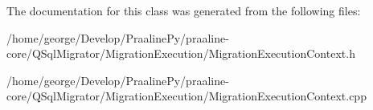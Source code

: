 The documentation for this class was generated from the following files\+:\begin{DoxyCompactItemize}
\item 
/home/george/\+Develop/\+Praaline\+Py/praaline-\/core/\+Q\+Sql\+Migrator/\+Migration\+Execution/Migration\+Execution\+Context.\+h\item 
/home/george/\+Develop/\+Praaline\+Py/praaline-\/core/\+Q\+Sql\+Migrator/\+Migration\+Execution/Migration\+Execution\+Context.\+cpp\end{DoxyCompactItemize}
